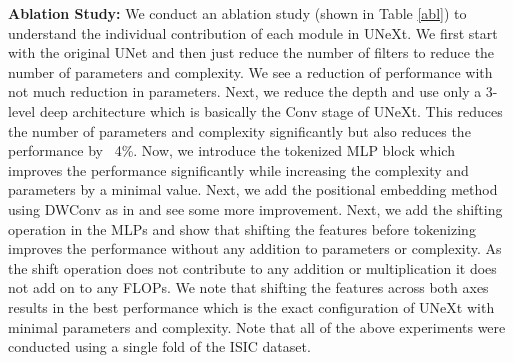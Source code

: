 \documentclass[runningheads]{llncs}
\begin{document}
\noindent \textbf{Ablation Study:} We conduct an ablation study (shown in Table \ref{abl}) to understand the individual contribution of each module in UNeXt. We first start with the original UNet and then just reduce the number of filters to reduce the number of parameters and complexity. We see a reduction of performance with not much reduction in parameters. Next, we reduce the depth and use only a 3-level deep architecture which is basically the Conv stage of UNeXt. This reduces the number of parameters and complexity significantly but also reduces the performance by ~4\%. Now, we introduce the tokenized MLP block which improves the performance significantly while increasing the complexity and parameters by a minimal value. Next, we add the positional embedding method using DWConv as in \cite{xie2021segformer} and see some more improvement. Next, we add the shifting operation in the MLPs and show that shifting the features before tokenizing improves the performance without any addition to parameters or complexity. As the shift operation does not contribute to any addition or multiplication it does not add on to any FLOPs. We note that shifting the features across both axes results in the best performance which is the exact configuration of UNeXt with  minimal parameters and complexity. Note that all of the above experiments were conducted using a single fold of the ISIC dataset.

\begin{table}[]
\centering
\caption{Ablation Study.}

\label{abl}
\end{table}
\end{document}
